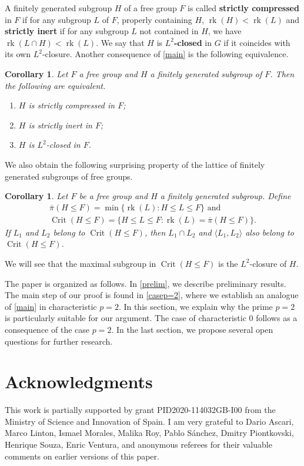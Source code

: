 \documentclass{amsart}
\newtheorem{cor}[lem]{Corollary}
\theoremstyle{definition}
\theoremstyle{remark}
\DeclareMathOperator{\Crit}{Crit}
\DeclareMathOperator{\rk}{rk}
\newcommand{\bpi}{\overline{\pi}}
\begin{document}
A finitely generated subgroup $H$  of a free group $F$ is called {\bf strictly compressed} in $F$ if for any subgroup $  L$ of $F$, properly containing $H$, $\rk(H)< \rk(L)$ and {\bf strictly inert}
  if for any subgroup $L$ not contained in $H$, we have
$\rk(L\cap H) < \rk(L)$. 
We say that $H$ is {\bf $L^2$-closed} in $G$ if it coincides with its own $L^2$-closure. Another consequence of \cref{main} is the following equivalence.
\begin{cor}\label{strictlycompressed}
Let $F$  a free group and $H$ a finitely generated subgroup of $F$. Then the following are equivalent.
\begin{enumerate}
\item $H$ is strictly compressed in $F$;
\item $H$ is strictly inert in $F$;
\item  $H$ is $L^2$-closed in $F$.
\end{enumerate}
\end{cor}

We also obtain  the following surprising property of the lattice of finitely generated subgroups of free groups.
\begin{cor}\label{crit}
Let $F$ be a free group and $H$ a finitely generated subgroup. Define
\begin{multline*}
\bpi(H\leq F)=\min\{\rk(L)\colon H\le L\le F\} \textrm{\ and\ }\\ \Crit(H\leq F)=\{H\leq L\leq F:  \rk(L) =\bpi(H\leq F)\}.
\end{multline*}
If  $L_1$ and $L_2$ belong to $\Crit(H\leq F)$, then $L_1\cap L_2$ and $\langle L_1,L_2\rangle$ also belong to $\Crit(H\leq F)$. \end{cor}
We will see that the maximal  subgroup in $\Crit(H\leq F)$   is the $L^2$-closure of $H$. %
  
The paper is organized as follows. In \cref{prelim}, we describe preliminary results. The main step of our proof is found in \cref{casep=2}, where we establish an analogue of \cref{main} in characteristic $p = 2$. In this section, we explain why the prime $p = 2$ is particularly suitable for our argument. The case of characteristic 0 follows as a consequence of the case $p = 2$.
In the last section, we propose several open questions for further research.
 
 \section*{Acknowledgments}This work is partially supported by grant PID2020-114032GB-I00 from the Ministry of Science and Innovation of Spain. I am very grateful to Dario Ascari, Marco Linton, Ismael Morales, Malika Roy, Pablo Sánchez, Dmitry Piontkovski, Henrique Souza, Enric Ventura, and anonymous referees for their valuable comments on earlier versions of this paper.
\end{document}
